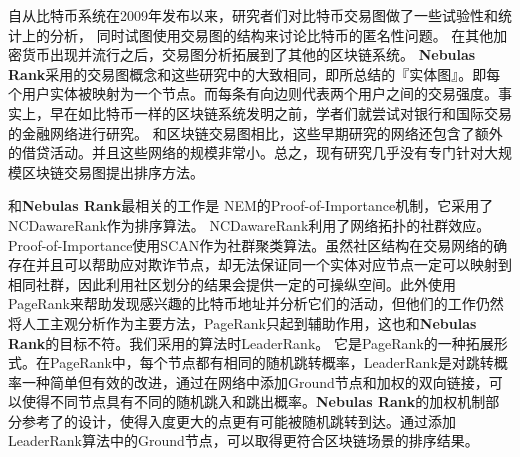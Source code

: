 自从比特币\cite{Nakamoto2008}系统在2009年发布以来，研究者们对比特币交易图做了一些试验性和统计上的分析\cite{Ron}\cite{Haslhofer}\cite{NielKondor2014}\cite{Baumann2014}， 同时试图使用交易图的结构来讨论比特币的匿名性问题\cite{Meiklejohn2013}\cite{Ober2013}\cite{pham2016anomaly}\cite{Fleder2015}\cite{Ferrin2015}。 在其他加密货币出现并流行之后，交易图分析拓展到了其他的区块链系统\cite{Chang2017}\cite{Anderson2016}。 \textbf{Nebulas Rank}采用的交易图概念和这些研究中的大致相同，即\textcite{Tschorsch2015}所总结的『实体图』。即每个用户实体被映射为一个节点。而每条有向边则代表两个用户之间的交易强度。事实上，早在如比特币一样的区块链系统发明之前，学者们就尝试对银行和国际交易的金融网络进行研究\cite{propper2008towards}\cite{Boss2004}\cite{Serrano2007}\cite{Bech2008}\cite{Fagiolo2009}\cite{Morten2006}\cite{Boss2004a}\cite{Krempel2002}\cite{Serrano2003}。 和区块链交易图相比，这些早期研究的网络还包含了额外的借贷活动。并且这些网络的规模非常小。总之，现有研究几乎没有专门针对大规模区块链交易图提出排序方法。

和\textbf{Nebulas Rank}最相关的工作是 NEM\cite{nem}的Proof-of-Importance机制，它采用了 NCDawareRank\cite{Nikolakopoulos2013}作为排序算法。 NCDawareRank\cite{Nikolakopoulos2013}利用了网络拓扑的社群效应。Proof-of-Importance使用SCAN\cite{xu2007scan}\cite{shiokawa2015scan}\cite{chang2017mathsf}作为社群聚类算法。虽然社区结构在交易网络的确存在并且可以帮助应对欺诈节点，却无法保证同一个实体对应节点一定可以映射到相同社群，因此利用社区划分的结果会提供一定的可操纵空间。此外\textcite{Fleder2015}使用PageRank来帮助发现感兴趣的比特币地址并分析它们的活动，但他们的工作仍然将人工主观分析作为主要方法，PageRank只起到辅助作用，这也和\textbf{Nebulas Rank}的目标不符。我们采用的算法时LeaderRank\cite{Chen2013}\cite{Li2014}。 它是PageRank的一种拓展形式。在PageRank中，每个节点都有相同的随机跳转概率，LeaderRank是对跳转概率一种简单但有效的改进，通过在网络中添加Ground节点和加权的双向链接，可以使得不同节点具有不同的随机跳入和跳出概率。\textbf{Nebulas Rank}的加权机制部分参考了\textcite{Li2014}的设计，使得入度更大的点更有可能被随机跳转到达。通过添加LeaderRank算法中的Ground节点，可以取得更符合区块链场景的排序结果。


